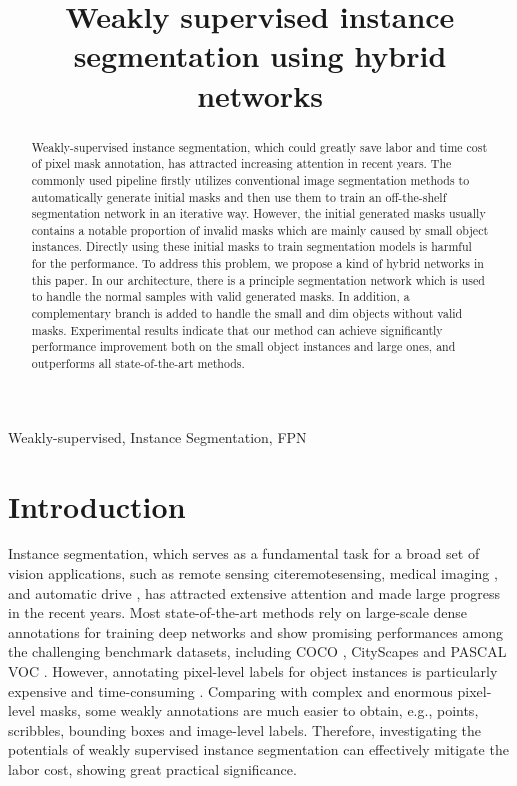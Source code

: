 \documentclass{article}
\title{Weakly supervised instance segmentation using hybrid networks}
\begin{document}
%
\maketitle
%
\begin{abstract}
Weakly-supervised instance segmentation, which could greatly save labor and time cost of pixel mask annotation, has attracted increasing attention in recent years.
The commonly used pipeline firstly utilizes conventional image segmentation methods to automatically generate initial masks and then use them to train an off-the-shelf segmentation network in an iterative way.
However, the initial generated masks usually contains a notable proportion of invalid masks which are mainly caused by small object instances.
Directly using these initial masks to train segmentation models is harmful for the performance.
To address this problem, we propose a kind of hybrid networks in this paper.
In our architecture, there is a principle segmentation network which is used to handle the normal samples with valid generated masks.
In addition, a complementary branch is added to handle the small and dim objects without valid masks.
Experimental results indicate that our method can achieve significantly performance improvement both on the small object instances and large ones, and outperforms all state-of-the-art methods.

\end{abstract}
%
\begin{keywords} Weakly-supervised, Instance Segmentation, FPN
\end{keywords}
%
\section{Introduction}
\label{sec:intro}
Instance segmentation, which serves as a fundamental task for a broad set of vision applications, such as remote sensing cite{remotesensing}, medical imaging \cite{medicalimaging}, and automatic drive \cite{driving}, has attracted extensive attention and made large progress in the recent years.
Most state-of-the-art methods \cite{maskrcnn, Panet} rely on large-scale dense annotations for training deep networks and show promising performances among the challenging benchmark datasets, including COCO \cite{lin2014microsoft}, CityScapes \cite{CityScapes} and PASCAL VOC \cite{everingham2010pascal}.
However, annotating pixel-level labels for object instances is particularly expensive and time-consuming \cite{russakovsky2015imagenet}.
Comparing with complex and enormous pixel-level masks, some weakly annotations are much easier to obtain, e.g., points, scribbles, bounding boxes and image-level labels.
Therefore, investigating the potentials of weakly supervised instance segmentation can effectively mitigate the labor cost, showing great practical significance.
\end{document}
